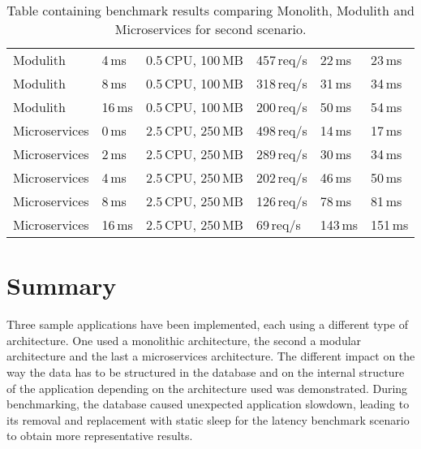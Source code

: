 \begin{table}
\begin{tabular}{ |p{3cm}||p{1.2cm}|p{3cm}|p{1.5cm}|p{1.5cm}|p{1.5cm}| }
        Modulith      & 4\,ms         & 0.5\,CPU, 100\,MB & 457\,req/s & 22\,ms  & 23\,ms    \\ %
        Modulith      & 8\,ms         & 0.5\,CPU, 100\,MB & 318\,req/s & 31\,ms  & 34\,ms    \\ %
        Modulith      & 16\,ms        & 0.5\,CPU, 100\,MB & 200\,req/s & 50\,ms  & 54\,ms    \\ %
        \rowcolor{Gray}
        Microservices & 0\,ms         & 2.5\,CPU, 250\,MB & 498\,req/s & 14\,ms  & 17\,ms    \\ %
        Microservices & 2\,ms         & 2.5\,CPU, 250\,MB & 289\,req/s & 30\,ms  & 34\,ms    \\ %
        Microservices & 4\,ms         & 2.5\,CPU, 250\,MB & 202\,req/s & 46\,ms  & 50\,ms    \\ %
        Microservices & 8\,ms         & 2.5\,CPU, 250\,MB & 126\,req/s & 78\,ms  & 81\,ms    \\ %
        Microservices & 16\,ms        & 2.5\,CPU, 250\,MB & 69\,req/s  & 143\,ms & 151\,ms   \\ %
        \hline
    \end{tabular}
    \caption{Table containing benchmark results comparing Monolith, Modulith and Microservices for second scenario.\label{table:benchmark_scenario2_v2}}
\end{table}


\section{Summary}
Three sample applications have been implemented, each using a different type of architecture. One used a monolithic architecture, the second a modular architecture and the last a microservices architecture. The different impact on the way the data has to be structured in the database and on the internal structure of the application depending on the architecture used was demonstrated. During benchmarking, the database caused unexpected application slowdown, leading to its removal and replacement with static sleep for the latency benchmark scenario to obtain more representative results.



